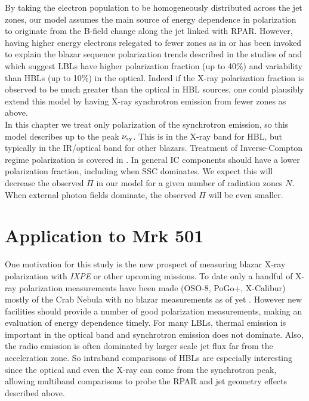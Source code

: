By taking the electron population to be homogeneously distributed across the jet zones, our model assumes the main source of energy dependence in polarization to originate from the B-field change along the jet linked with RPAR. However, having higher energy electrons relegated to fewer zones as in \citet{marscher_rapid_2010} or \citet{angelakis_robopol_2016} has been invoked to explain the blazar sequence polarization trends described in the studies of \citet{itoh_systematic_2016} and \citet{angelakis_robopol_2016} which suggest LBLs have higher polarization fraction (up to 40\%) and variability than HBLs (up to 10\%) in the optical. Indeed if the X-ray polarization fraction is observed to be much greater than the optical in HBL sources, one could plausibly extend this model by having X-ray synchrotron emission from fewer zones as above. \\ 
In this chapter we treat only polarization of the synchrotron emission, so this model describes up to the peak $\nu_{\rm sy}$. This is in the X-ray band for HBL, but typically in the IR/optical band for other blazars. Treatment of Inverse-Compton regime polarization is covered in \citet{zhang_polarization_2016}. In general IC components should have a lower polarization fraction, including when SSC dominates. We expect this will decrease the observed $\Pi$ in our model for a given number of radiation zones $N$. When external photon fields dominate, the observed $\Pi$ will be even smaller. 

\section{Application to Mrk 501}
	One motivation for this study is the new prospect of measuring blazar X-ray polarization with {\it IXPE} \citep{weisskopf_imaging_2016} or other upcoming missions. To date only a handful of X-ray polarization measurements have been made (OSO-8, PoGo+, X-Calibur) mostly of the Crab Nebula with no blazar measurements as of yet \citep{kislat_optimization_2018}. However new facilities should provide a number of good polarization measurements, making an evaluation of energy dependence timely.
For many LBLs, thermal emission is important in the optical band and synchrotron emission does not dominate. Also, the radio emission is often dominated by larger scale jet flux far from the acceleration zone. So intraband comparisons of HBLs are especially interesting since the optical and even the X-ray can come from the synchrotron peak, allowing multiband comparisons to probe the RPAR and jet geometry effects described above. 
    
